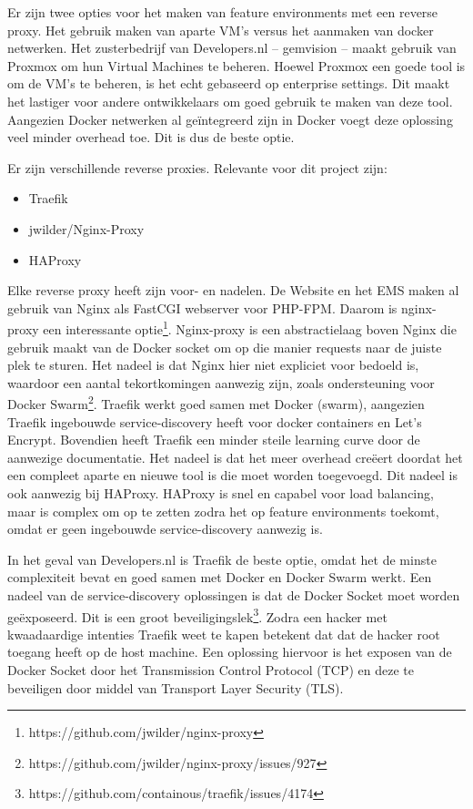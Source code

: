 Er zijn twee opties voor het maken van feature environments met een reverse proxy. Het gebruik maken van aparte VM's versus het aanmaken van docker netwerken. Het zusterbedrijf van Developers.nl -- gemvision -- maakt gebruik van Proxmox om hun Virtual Machines te beheren. Hoewel Proxmox een goede tool is om de VM's te beheren, is het echt gebaseerd op enterprise settings. Dit maakt het lastiger voor andere ontwikkelaars om goed gebruik te maken van deze tool. Aangezien Docker netwerken al geïntegreerd zijn in Docker voegt deze oplossing veel minder overhead toe. Dit is dus de beste optie.

Er zijn verschillende reverse proxies. Relevante voor dit project zijn:
\begin{itemize}
	\item Traefik
	\item jwilder/Nginx-Proxy
	\item HAProxy	
\end{itemize}

Elke reverse proxy heeft zijn voor- en nadelen. De Website en het EMS maken al gebruik van Nginx als FastCGI webserver voor PHP-FPM. Daarom is nginx-proxy een interessante optie\footnote{https://github.com/jwilder/nginx-proxy}. Nginx-proxy is een abstractielaag boven Nginx die gebruik maakt van de Docker socket om op die manier requests naar de juiste plek te sturen. Het nadeel is dat Nginx hier niet expliciet voor bedoeld is, waardoor een aantal tekortkomingen aanwezig zijn, zoals ondersteuning voor Docker Swarm\footnote{https://github.com/jwilder/nginx-proxy/issues/927}. Traefik werkt goed samen met Docker (swarm), aangezien Traefik ingebouwde service-discovery heeft voor docker containers en Let's Encrypt. Bovendien heeft Traefik een minder steile learning curve door de aanwezige documentatie. Het nadeel is dat het meer overhead creëert doordat het een compleet aparte en nieuwe tool is die moet worden toegevoegd. Dit nadeel is ook aanwezig bij HAProxy. HAProxy is snel en capabel voor load balancing, maar is complex om op te zetten zodra het op feature environments toekomt, omdat er geen ingebouwde service-discovery aanwezig is. 

In het geval van Developers.nl is Traefik de beste optie, omdat het de minste complexiteit bevat en goed samen met Docker en Docker Swarm werkt. Een nadeel van de service-discovery oplossingen is dat de Docker Socket moet worden geëxposeerd. Dit is een groot beveiligingslek\footnote{https://github.com/containous/traefik/issues/4174}. Zodra een hacker met kwaadaardige intenties Traefik weet te kapen betekent dat dat de hacker root toegang heeft op de host machine. Een oplossing hiervoor is het exposen van de Docker Socket door het Transmission Control Protocol (TCP) en deze te beveiligen door middel van Transport Layer Security (TLS).


